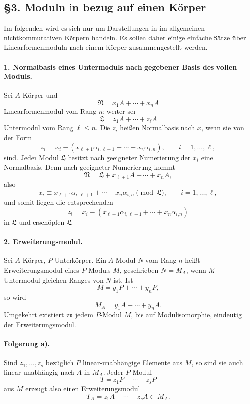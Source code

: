 \documentclass[11pt]{article}
\providecommand{\frN}{\mathfrak N}
\providecommand{\frL}{\mathfrak L}
\begin{document}
\subsection*{§3. Moduln in bezug auf einen Körper}

Im folgenden wird es sich nur um Darstellungen in im allgemeinen nichtkommutativen Körpern handeln. Es sollen daher einige einfache Sätze über Linearformenmoduln nach einem Körper zusammengestellt werden.

\paragraph{1. Normalbasis eines Untermoduls nach gegebener Basis des vollen Moduls.}
Sei \(A\) Körper und
\[
        \frN=x_1A+\cdots+x_nA
\]
Linearformenmodul vom Rang \(n\); weiter sei
\[
        \frL=z_1A+\cdots+z_\ell A
\]
Untermodul vom Rang \(\ell\le n\). Die \(z_i\) heißen Normalbasis nach \(x\), wenn sie von der Form
\[
        z_i=x_i-(x_{\ell+1}\alpha_{i,\ell+1}+\cdots+x_n\alpha_{i,n}),
        \qquad i=1,\ldots,\ell,
\]
sind. Jeder Modul \(\frL\) besitzt nach geeigneter Numerierung der \(x_i\) eine Normalbasis. Denn nach geeigneter Numerierung kommt
\[
        \frN=\frL+x_{\ell+1}A+\cdots+x_nA,
\]
also
\[
        x_i\equiv x_{\ell+1}\alpha_{i,\ell+1}+\cdots+x_n\alpha_{i,n}
        \pmod{\frL},\qquad i=1,\ldots,\ell,
\]
und somit liegen die entsprechenden
\[
        z_i=x_i-(x_{\ell+1}\alpha_{i,\ell+1}+\cdots+x_n\alpha_{i,n})
\]
in \(\frL\) und erschöpfen \(\frL\).

\paragraph{2. Erweiterungsmodul.}
Sei \(A\) Körper, \(P\) Unterkörper. Ein \(A\)-Modul \(N\) vom Rang \(n\) heißt Erweiterungsmodul eines \(P\)-Moduls \(M\), geschrieben \(N=M_A\), wenn \(M\) Untermodul gleichen Ranges von \(N\) ist. Ist
\[
        M=y_1P+\cdots+y_nP,
\]
so wird
\[
        M_A=y_1A+\cdots+y_nA.
\]
Umgekehrt existiert zu jedem \(P\)-Modul \(M\), bis auf Modulisomorphie, eindeutig der Erweiterungsmodul.

\paragraph{Folgerung a).}
Sind \(z_1,\ldots,z_s\) bezüglich \(P\) linear-unabhängige Elemente aus \(M\), so sind sie auch linear-unabhängig nach \(A\) in \(M_A\). Jeder \(P\)-Modul
\[
        T=z_1P+\cdots+z_sP
\]
aus \(M\) erzeugt also einen Erweiterungsmodul
\[
        T_A=z_1A+\cdots+z_sA\subset M_A.
\]
\end{document}
